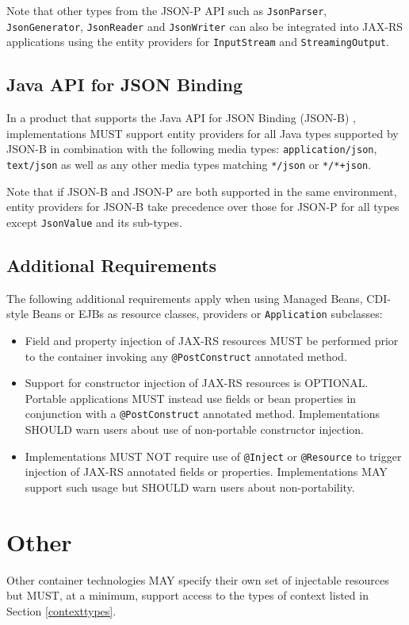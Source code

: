 Note that other types from the JSON-P API such as \lstinline{JsonParser}, \lstinline{JsonGenerator},
\lstinline{JsonReader} and \lstinline{JsonWriter} can also be integrated into JAX-RS applications using the entity
providers for \lstinline{InputStream} and \lstinline{StreamingOutput}.


\subsection{Java API for JSON Binding}
\label{jsonb}
In a product that supports the Java API for JSON Binding (JSON-B) \cite{jsonb},
implementations MUST support entity providers for all Java types supported by JSON-B in combination with the following
media types: \lstinline{application/json}, \lstinline{text/json} as well as any other media types matching
\lstinline{*/json} or \lstinline{*/*+json}.

Note that if JSON-B and JSON-P are both supported in the same environment, entity providers for JSON-B take precedence
over those for JSON-P for all types except \lstinline{JsonValue} and its sub-types.


\subsection{Additional Requirements}
\label{additional_reqs}

The following additional requirements apply when using Managed Beans, CDI-style Beans or EJBs as resource classes,
providers or \lstinline{Application} subclasses:

\begin{itemize}
    \item Field and property injection of JAX-RS resources MUST be performed prior to the container invoking any
    \lstinline{@PostConstruct} annotated method.
    \item Support for constructor injection of JAX-RS resources is OPTIONAL. Portable applications MUST instead use
    fields or bean properties in conjunction with a \lstinline{@PostConstruct} annotated method. Implementations SHOULD
    warn users about use of non-portable constructor injection.
    \item Implementations MUST NOT require use of \lstinline{@Inject} or \lstinline{@Resource} to trigger injection of
    JAX-RS annotated fields or properties. Implementations MAY support such usage but SHOULD warn users about
    non-portability.
\end{itemize}

\section{Other}

Other container technologies MAY specify their own set of injectable resources but MUST, at a minimum, support access to
the types of context listed in Section \ref{contexttypes}.
